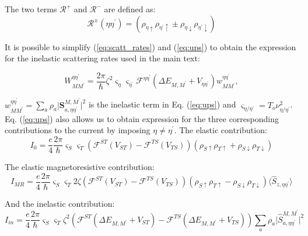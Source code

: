 \documentclass[reprint,amsmath,amssymb,aps,nofootinbib,onecolumn]{revtex4-2}
\begin{document}
The two terms $\mathcal{R}^{+}$ and $\mathcal{R}^{-}$ are defined as:
\begin{equation}
    \mathcal{R}^{\pm}(\eta\eta^{\prime})=\left( \rho_{\eta \uparrow} \rho_{\eta^{\prime}\uparrow} \pm \rho_{\eta \downarrow} \rho_{\eta^{\prime}\downarrow} \right)
    \label{eq:R_+-}
\end{equation}

It is possible to simplify (\ref{eq:scatt_rates}) and (\ref{eq:ups}) to obtain the expression for the inelastic scattering rates used in the main text:

\begin{equation}
    W_{MM^{\prime}}^{\eta \eta^{\prime}}=\dfrac{2\pi}{\hbar} \zeta^2 \varsigma_{\eta} \varsigma_{\eta^{\prime}} \mathcal{F}^{\eta\eta^{\prime}}(\Delta E_{M,M^{\prime}}+V_{\eta \eta^{\prime}} )  w_{MM^{\prime}}^{\eta \eta^{\prime}},
    \label{eq:elec_rates}
\end{equation}

 $w_{MM^{\prime}}^{\eta \eta^{\prime}} = \sum_{a} \rho_a \lvert {\textbf{S}_{a,\eta\eta^{\prime}}^{M,M^{\prime}}}\rvert^{2}$ is the inelastic term in Eq. (\ref{eq:ups}) and $\varsigma_{\eta/\eta^{\prime}} = T_o \nu^2_{\eta/\eta^{\prime}}$. Eq. (\ref{eq:ups}) also allows us to obtain expression for the three corresponding contributions to the current by imposing $\eta \neq \eta^{\prime} $.
The elastic contribution:
\begin{equation}
I_0=\dfrac{e}{4} \dfrac{2\pi}{\hbar}  \varsigma_{S} \varsigma_{T} \left( \mathcal{F}^{ST}(V_{ST})-\mathcal{F}^{TS}(V_{TS}) \right) \left( \rho_{S \uparrow} \rho_{T\uparrow} + \rho_{S \downarrow} \rho_{T\downarrow} \right)
\label{eq:I_0}
\end{equation}

The elastic magnetoresistive contribution:
\begin{equation}
I_{MR}=\dfrac{e}{4} \dfrac{2\pi}{\hbar}\varsigma_{S} \varsigma_{T}  2 \zeta  \left( \mathcal{F}^{ST}(V_{ST})-\mathcal{F}^{TS}(V_{TS}) \right) \left( \rho_{S \uparrow} \rho_{T\uparrow} - \rho_{S \downarrow} \rho_{T\downarrow} \right) \langle \hat{S}_{z,\eta\eta^{\prime}} \rangle
\label{eq:I_MR}
\end{equation}

And the inelastic contribution:
\begin{equation}
I_{in}=\dfrac{e}{4} \dfrac{2\pi}{\hbar}\varsigma_{S} \varsigma_{T} \zeta^2  \left( \mathcal{F}^{ST}(\Delta E_{M,M^{\prime}}+V_{ST})-\mathcal{F}^{TS}(\Delta E_{M,M^{\prime}}+V_{TS}) \right) \sum_{a} \rho_a \lvert {\hat{S}_{a,\eta\eta^{\prime}}^{M,M^{\prime}}}\rvert^{2}
\label{eq:I_in}
\end{equation}
\end{document}
